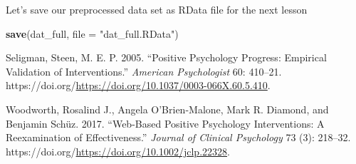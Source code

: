\documentclass[
]{article}
\newenvironment{Shaded}{\begin{snugshade}}{\end{snugshade}}
\newcommand{\AttributeTok}[1]{\textcolor[rgb]{0.13,0.29,0.53}{#1}}
\newcommand{\FunctionTok}[1]{\textcolor[rgb]{0.13,0.29,0.53}{\textbf{#1}}}
\newcommand{\NormalTok}[1]{#1}
\newcommand{\StringTok}[1]{\textcolor[rgb]{0.31,0.60,0.02}{#1}}
\newlength{\cslhangindent}
\newlength{\cslentryspacingunit} %
\newenvironment{CSLReferences}[2] %
 {%
  \setlength{\parindent}{0pt}
  \ifodd #1
  \let\oldpar\par
  \def\par{\hangindent=\cslhangindent\oldpar}
  \fi
  \setlength{\parskip}{#2\cslentryspacingunit}
 }%
 {}
\begin{document}
Let's save our preprocessed data set as RData file for the next lesson

\begin{Shaded}
\begin{Highlighting}[]
\FunctionTok{save}\NormalTok{(dat\_full, }\AttributeTok{file =} \StringTok{"dat\_full.RData"}\NormalTok{)}
\end{Highlighting}
\end{Shaded}

\hypertarget{refs}{}
\begin{CSLReferences}{1}{0}
\leavevmode{}%
Seligman, Steen, M. E. P. 2005. {``Positive Psychology Progress:
Empirical Validation of Interventions.''} \emph{American Psychologist}
60: 410--21.
https://doi.org/\url{https://doi.org/10.1037/0003-066X.60.5.410}.

\leavevmode{}%
Woodworth, Rosalind J., Angela O'Brien-Malone, Mark R. Diamond, and
Benjamin Schüz. 2017. {``Web-Based Positive Psychology Interventions: A
Reexamination of Effectiveness.''} \emph{Journal of Clinical Psychology}
73 (3): 218--32.
https://doi.org/\url{https://doi.org/10.1002/jclp.22328}.

\end{CSLReferences}
\end{document}
